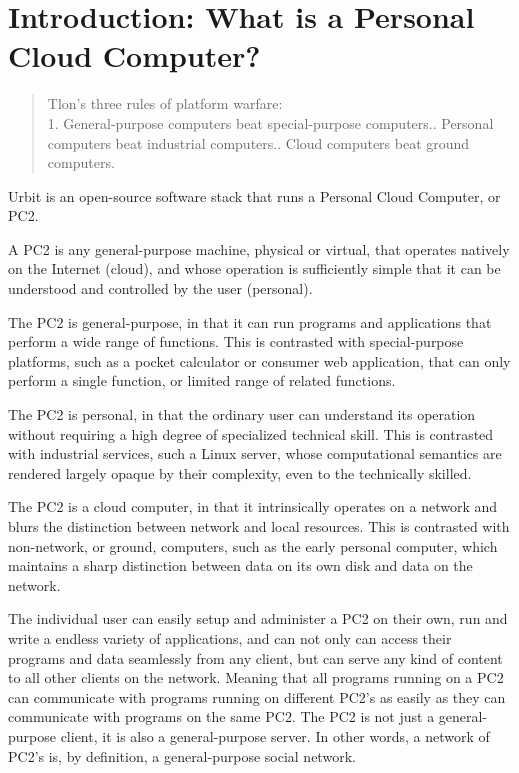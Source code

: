 \chapter{Introduction: What is a Personal Cloud Computer?}

\begin{quote}
\noindent Tlon's three rules of platform warfare:\newline
\medskip \\
1. General-purpose computers beat special-purpose computers.. Personal computers beat industrial computers.. Cloud computers beat ground computers.
\end{quote}

Urbit is an open-source software stack that runs a Personal Cloud Computer, or
PC2.  

A PC2 is any general-purpose machine, physical or virtual, that operates
natively on the Internet (cloud), and whose operation is sufficiently simple
that it can be understood and controlled by the user (personal). 

The PC2 is general-purpose, in that it can run programs and applications that
perform a wide range of functions. This is contrasted with special-purpose
platforms, such as a pocket calculator or consumer web application, that can
only perform a single function, or limited range of related functions.

The PC2 is personal, in that the ordinary user can understand its operation
without requiring a high degree of specialized technical skill. This is
contrasted with industrial services, such a Linux server, whose computational
semantics are rendered largely opaque by their complexity, even to the
technically skilled.

The PC2 is a cloud computer, in that it intrinsically operates on a network and
blurs the distinction between network and local resources. This is contrasted
with non-network, or ground, computers, such as the early personal computer,
which maintains a sharp distinction between data on its own disk and data on
the network.

The individual user can easily setup and administer a PC2 on their own, run and
write a endless variety of applications, and can not only can access their
programs and data seamlessly from any client, but can serve any kind of content
to all other clients on the network. Meaning that all programs running on a
PC2 can communicate with programs running on different PC2's as easily as they
can communicate with programs on the same PC2. The PC2 is not just a
general-purpose client, it is also a general-purpose server. In other words, a
network of PC2's is, by definition, a general-purpose social network. 

